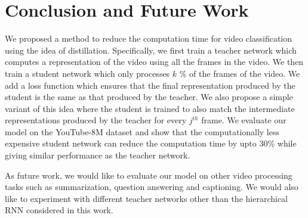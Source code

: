 \documentclass[10pt,twocolumn,letterpaper]{article}
\newcommand{\Model}{\textsc{TeaStud}\xspace}
\begin{document}
\section{Conclusion and Future Work}
We proposed a method to reduce the computation time for video classification using the idea of distillation. Specifically, we first train a teacher network which computes a representation of the video using all the frames in the video. We then train a student network which only processes $k$ \% of the frames of the video. We add a loss function which ensures that the final representation produced by the student is the same as that produced by the teacher. We also propose a simple variant of this idea where the student is trained to also match the intermediate representations produced by the teacher for every $j^{th}$ frame. We evaluate our model on the YouTube-8M dataset and show that the computationally less expensive student network can reduce the computation time by upto $30\%$ while giving similar performance as the teacher network. 

As future work, we would like to evaluate our model on other video processing tasks such as summarization, question answering and captioning. We would also like to experiment with different teacher networks other than the hierarchical RNN considered in this work.





{\small


}
\end{document}
